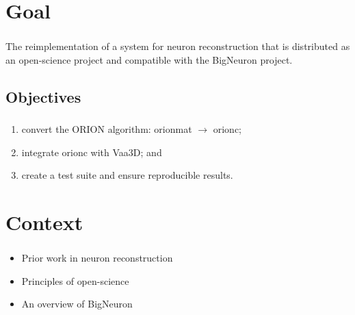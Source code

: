 \documentclass{beamer}
\newcommand{\tbackground}[1]{#1}
\newcommand{\tobjectives}[1]{#1}
\newcommand{\tbackground}[1]{\textcolor{tbackground}{#1}}
\newcommand{\tobjectives}[1]{\textcolor{tobjectives}{#1}}
\begin{document}
\section{Goal}
\begin{frame}\frametitle{\secname}
	\centering
	\tobjectives{%
	The reimplementation of  a system
		for \alert{neuron reconstruction}
		that is distributed as an \alert{open-science} project
		and
		compatible with the \alert{BigNeuron} project.
	}
\end{frame}

\subsection{Objectives}
\begin{frame}\frametitle{\subsecname}
	\tobjectives{%
	\begin{enumerate}[<+->]
		\setlength\itemsep{1em}
		\item convert the ORION algorithm: \gls{orionmat} $\rightarrow$ \gls{orionc};
		\item integrate \gls{orionc} with Vaa3D;
			and %
		\item create a test suite and ensure
			reproducible results. %
	\end{enumerate}
	}
\end{frame}

\section{Context}
\begin{frame}\frametitle{\secname}
	\tbackground{%
	\begin{itemize}
		\item Prior work in \alert{neuron reconstruction}
		\item Principles of \alert{open-science}
		\item An overview of \alert{BigNeuron}
	\end{itemize}
	}
\end{frame}
\end{document}
